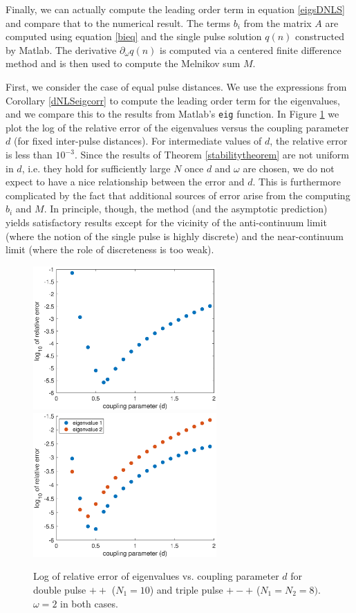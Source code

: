 \documentclass[12pt]{article}
\begin{document}
Finally, we can actually compute the leading order term in equation \eqref{eigsDNLS} and compare that to the numerical result. The terms $b_i$ from the matrix $A$ are computed using equation \eqref{bieq} and the single pulse solution $q(n)$ constructed by Matlab. The derivative $\partial_\omega q(n)$ is computed via a centered finite difference method and is then used to compute the Melnikov sum $M$. 

First, we consider the case of equal pulse distances. We use the expressions from Corollary \ref{dNLSeigcorr} to compute the leading order term for the eigenvalues, and we compare this to the results from Matlab's \texttt{eig} function. In Figure \ref{fig:error1} we plot the log of the relative error of the eigenvalues versus the coupling parameter $d$
(for fixed inter-pulse distances). For intermediate values of $d$, the relative error is less than $10^{-3}$. Since the results of Theorem \eqref{stabilitytheorem} are not uniform in $d$, i.e. they hold for sufficiently large $N$ once $d$ and $\omega$ are chosen, we do not expect to have a nice relationship between the error and $d$. This is furthermore complicated by the fact that additional sources of error arise from the computing $b_i$ and $M$. In principle, though, the method (and the asymptotic prediction) yields
satisfactory results except for the vicinity of the 
anti-continuum limit (where the notion of the single
pulse is highly discrete) and the near-continuum limit
(where the role of discreteness is too weak). 

\begin{figure}[H]
\centering
\includegraphics[width=7cm]{errors1.eps}
\includegraphics[width=7cm]{errors2.eps}
\caption{Log of relative error of eigenvalues vs. coupling parameter $d$ for double pulse $++$ ($N_1 = 10$) and triple pulse $+-+$ ($N_1 = N_2 = 8)$. $\omega = 2$ in both cases.}
\label{fig:error1}
\end{figure}
\end{document}
